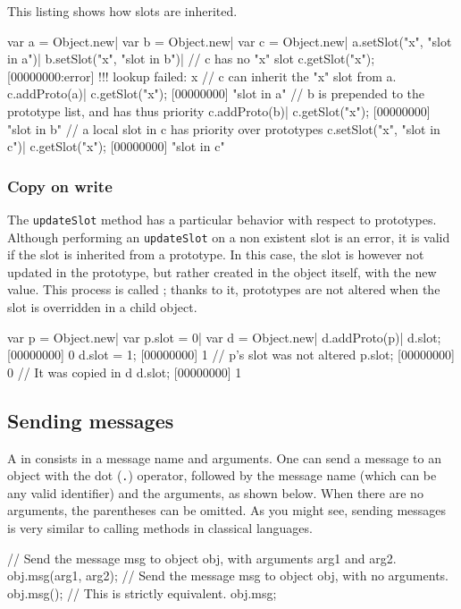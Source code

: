 This listing shows how slots are inherited.

\begin{urbiscript}
var a = Object.new|
var b = Object.new|
var c = Object.new|
a.setSlot("x", "slot in a")|
b.setSlot("x", "slot in b")|
// c has no "x" slot
c.getSlot("x");
[00000000:error] !!! lookup failed: x
// c can inherit the "x" slot from a.
c.addProto(a)|
c.getSlot("x");
[00000000] "slot in a"
// b is prepended to the prototype list, and has thus priority
c.addProto(b)|
c.getSlot("x");
[00000000] "slot in b"
// a local slot in c has priority over prototypes
c.setSlot("x", "slot in c")|
c.getSlot("x");
[00000000] "slot in c"
\end{urbiscript}

\subsubsection{Copy on write}

The \lstinline|updateSlot| method has a particular behavior with
respect to prototypes. Although performing an \lstinline|updateSlot|
on a non existent slot is an error, it is valid if the slot is
inherited from a prototype. In this case, the slot is however not
updated in the prototype, but rather created in the object itself,
with the new value. This process is called ; thanks
to it, prototypes are not altered when the slot is overridden in a
child object.

\begin{urbiscript}
var p = Object.new|
var p.slot = 0|
var d = Object.new|
d.addProto(p)|
d.slot;
[00000000] 0
d.slot = 1;
[00000000] 1
// p's slot was not altered
p.slot;
[00000000] 0
// It was copied in d
d.slot;
[00000000] 1
\end{urbiscript}

\subsection{Sending messages}

A  in \us consists in a message name and arguments. One can
send a message to an object with the dot (\lstinline|.|) operator,
followed by the message name (which can be any valid identifier) and
the arguments, as shown below. When there are no
arguments, the parentheses can be omitted. As you might see,
sending messages is very similar to calling methods in classical
languages.

\begin{urbiunchecked}
// Send the message msg to object obj, with arguments arg1 and arg2.
obj.msg(arg1, arg2);
// Send the message msg to object obj, with no arguments.
obj.msg();
// This is strictly equivalent.
obj.msg;
\end{urbiunchecked}

